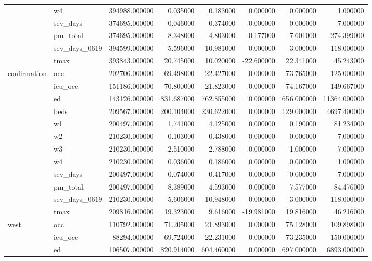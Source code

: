 \begin{tabular}{llrrrrrr}
 & w4 & 394988.000000 & 0.035000 & 0.183000 & 0.000000 & 0.000000 & 1.000000 \\
 & sev_days & 374695.000000 & 0.046000 & 0.374000 & 0.000000 & 0.000000 & 7.000000 \\
 & pm_total & 374695.000000 & 8.348000 & 4.803000 & 0.177000 & 7.601000 & 274.399000 \\
 & sev_days_0619 & 394599.000000 & 5.596000 & 10.981000 & 0.000000 & 3.000000 & 118.000000 \\
 & tmax & 393843.000000 & 20.745000 & 10.020000 & -22.600000 & 22.341000 & 45.243000 \\
\cline{1-8}
\multirow[t]{12}{*}{confirmation} & occ & 202706.000000 & 69.498000 & 22.427000 & 0.000000 & 73.765000 & 125.000000 \\
 & icu_occ & 151186.000000 & 70.800000 & 21.823000 & 0.000000 & 74.167000 & 149.667000 \\
 & ed & 143126.000000 & 831.687000 & 762.855000 & 0.000000 & 656.000000 & 11364.000000 \\
 & beds & 209567.000000 & 200.104000 & 230.622000 & 0.000000 & 129.000000 & 4697.400000 \\
 & w1 & 200497.000000 & 1.741000 & 4.125000 & 0.000000 & 0.190000 & 81.234000 \\
 & w2 & 210230.000000 & 0.103000 & 0.438000 & 0.000000 & 0.000000 & 7.000000 \\
 & w3 & 210230.000000 & 2.510000 & 2.788000 & 0.000000 & 1.000000 & 7.000000 \\
 & w4 & 210230.000000 & 0.036000 & 0.186000 & 0.000000 & 0.000000 & 1.000000 \\
 & sev_days & 200497.000000 & 0.074000 & 0.417000 & 0.000000 & 0.000000 & 7.000000 \\
 & pm_total & 200497.000000 & 8.389000 & 4.593000 & 0.000000 & 7.577000 & 84.476000 \\
 & sev_days_0619 & 210230.000000 & 5.606000 & 10.948000 & 0.000000 & 3.000000 & 118.000000 \\
 & tmax & 209816.000000 & 19.323000 & 9.616000 & -19.981000 & 19.816000 & 46.216000 \\
\cline{1-8}
\multirow[t]{12}{*}{west} & occ & 110792.000000 & 71.205000 & 21.893000 & 0.000000 & 75.128000 & 109.898000 \\
 & icu_occ & 88294.000000 & 69.724000 & 22.231000 & 0.000000 & 73.235000 & 150.000000 \\
 & ed & 106507.000000 & 820.914000 & 604.460000 & 0.000000 & 697.000000 & 6893.000000 \\

\end{tabular}
